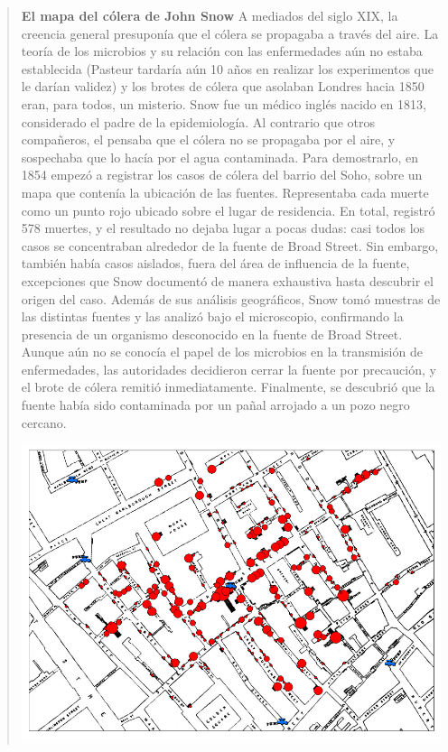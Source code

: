 \documentclass[
  letterpaper,
  DIV=11,
  numbers=noendperiod]{scrreprt}
\begin{document}
\begin{quote}
\textbf{El mapa del cólera de John Snow} A mediados del siglo XIX, la
creencia general presuponía que el cólera se propagaba a través del
aire. La teoría de los microbios y su relación con las enfermedades aún
no estaba establecida (Pasteur tardaría aún 10 años en realizar los
experimentos que le darían validez) y los brotes de cólera que asolaban
Londres hacia 1850 eran, para todos, un misterio. Snow fue un médico
inglés nacido en 1813, considerado el padre de la epidemiología. Al
contrario que otros compañeros, el pensaba que el cólera no se propagaba
por el aire, y sospechaba que lo hacía por el agua contaminada. Para
demostrarlo, en 1854 empezó a registrar los casos de cólera del barrio
del Soho, sobre un mapa que contenía la ubicación de las fuentes.
Representaba cada muerte como un punto rojo ubicado sobre el lugar de
residencia. En total, registró 578 muertes, y el resultado no dejaba
lugar a pocas dudas: casi todos los casos se concentraban alrededor de
la fuente de Broad Street. Sin embargo, también había casos aislados,
fuera del área de influencia de la fuente, excepciones que Snow
documentó de manera exhaustiva hasta descubrir el origen del caso.
Además de sus análisis geográficos, Snow tomó muestras de las distintas
fuentes y las analizó bajo el microscopio, confirmando la presencia de
un organismo desconocido en la fuente de Broad Street. Aunque aún no se
conocía el papel de los microbios en la transmisión de enfermedades, las
autoridades decidieron cerrar la fuente por precaución, y el brote de
cólera remitió inmediatamente. Finalmente, se descubrió que la fuente
había sido contaminada por un pañal arrojado a un pozo negro cercano.

\includegraphics{images/john_snow.png}
\end{quote}
\end{document}
